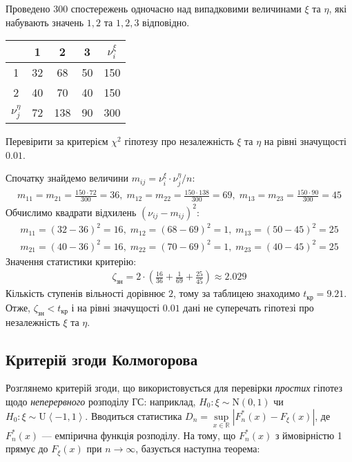 \begin{example}
    Проведено 300 спостережень одночасно над випадковими величинами $\xi$ та $\eta$, які набувають значень $1, 2$ та $1, 2, 3$ відповідно.
    \begin{center}
        \begin{tabular}{|c|c|c|c|c|}
            \hline
            \diagbox{$\xi$}{$\eta$} & 1 & 2 & 3 & $\nu_i^{\xi}$ \\
            \hline
            1 & 32 & 68 & 50 & 150 \\
            \hline
            2 & 40 & 70 & 40 & 150\\
            \hline
            $\nu_j^{\eta}$ & 72 & 138 & 90 & 300\\
            \hline
        \end{tabular}
    \end{center}
    Перевірити за критерієм $\chi^2$ гіпотезу про незалежність $\xi$ та $\eta$ на рівні значущості $0.01$.

    Спочатку знайдемо величини $m_{ij} = \nu_i^\xi\cdot \nu_j^\eta / n$:
    \begin{gather*}
        m_{1 1} = m_{2 1} = \frac{150 \cdot 72}{300} = 36, \; m_{1 2} = m_{2 2} = \frac{150 \cdot 138}{300} = 69, \;
        m_{1 3} = m_{2 3} = \frac{150 \cdot 90}{300} = 45
    \end{gather*}
    Обчислимо квадрати відхилень $\left(\nu_{ij} - m_{ij}\right)^2$:
    \begin{gather*}
        m_{1 1} = (32 - 36)^2 = 16, \; m_{1 2} = (68 - 69)^2 = 1, \; m_{1 3} = (50 - 45)^2 = 25 \\
        m_{2 1} = (40 - 36)^2 = 16, \; m_{2 2} = (70 - 69)^2 = 1, \; m_{2 3} = (40 - 45)^2 = 25
    \end{gather*}
    Значення статистики критерію:
    \begin{gather*}
        \zeta_{\text{зн}} = 2\cdot \left(\frac{16}{36} + \frac{1}{69} + \frac{25}{45}\right) \approx 2.029
    \end{gather*}
    Кількість ступенів вільності дорівнює $2$, тому за таблицею знаходимо $t_{\text{кр}} = 9.21$. Отже,
    $\zeta_{\text{зн}} < t_{\text{кр}}$ і на рівні значущості $0.01$ дані не суперечать гіпотезі про незалежність $\xi$ та $\eta$.
\end{example}

\subsection{Критерій згоди Колмогорова}
Розглянемо критерій згоди, що використовується для перевірки \emph{простих} гіпотез щодо \emph{неперервного} розподілу ГС: наприклад,
$H_0 : \xi \sim \mathrm{N}(0, 1)$ чи $H_0 : \xi \sim \mathrm{U}\left<-1, 1\right>$.
Вводиться статистика $D_n = \underset{x \in \mathbb{R}}{\sup} \left| F_n^*(x) - F_\xi(x)\right|$, де $F_n^*(x)$ --- емпірична функція розподілу.
На тому, що $F_n^*(x)$ з ймовірністю 1 прямує до $F_\xi(x)$ при $n\to\infty$, базується наступна теорема:


